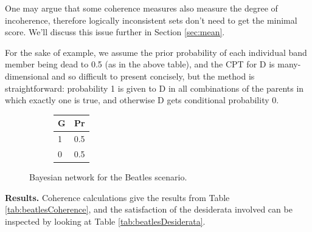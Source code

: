 \documentclass[
  10pt,
]{scrartcl}
\begin{document}
\noindent  One may argue that some coherence measures also measure the degree of incoherence, therefore logically inconsistent sets don't need to get the minimal score. We'll discuss this issue further in Section \ref{sec:mean}.

For the sake of example, we assume the prior probability of each individual band member being dead to 0.5 (as in the above table), and the CPT for \textsf{D} is many-dimensional and so difficult to present concisely, but the method is straightforward: probability 1 is given to \textsf{D} in all combinations of the parents in which exactly one is true, and otherwise \textsf{D} gets conditional probability 0.

\begin{figure}[H]
 \hfill
\begin{subfigure}[!ht]{0.2\textwidth}

\begin{tabular}{lr}
\toprule
G & Pr\\
\midrule
1 & 0.5\\
0 & 0.5\\
\bottomrule
\end{tabular}
\end{subfigure}
\caption{Bayesian network for the \textsf{Beatles} scenario.}
\end{figure}

\textbf{Results.} Coherence calculations give the results from Table \ref{tab:beatlesCoherence}, and the satisfaction of the desiderata involved can be inspected by looking at Table \ref{tab:beatlesDesiderata}.
\end{document}
